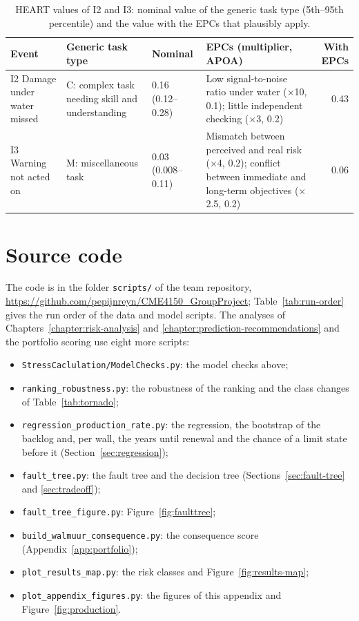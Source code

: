 \begin{table}[htbp]
\centering
\small
\caption{HEART values of I2 and I3: nominal value of the generic task type
(5th--95th percentile) and the value with the EPCs that plausibly apply.}
\label{tab:heart}
\begin{tabularx}{\textwidth}{@{}>{\raggedright\arraybackslash}p{2.4cm}
  >{\raggedright\arraybackslash}p{2.6cm} l >{\raggedright\arraybackslash}X r@{}}
\toprule
Event & Generic task type & Nominal & EPCs (multiplier, APOA) & With EPCs \\
\midrule
I2 Damage under water missed & C: complex task needing skill and understanding & 0.16 (0.12--0.28) & Low signal-to-noise ratio under water ($\times$10, 0.1); little independent checking ($\times$3, 0.2) & 0.43 \\
I3 Warning not acted on & M: miscellaneous task & 0.03 (0.008--0.11) & Mismatch between perceived and real risk ($\times$4, 0.2); conflict between immediate and long-term objectives ($\times$2.5, 0.2) & 0.06 \\
\bottomrule
\end{tabularx}
\end{table}

\clearpage
\section{Source code}
\label{app:pm-code}

The code is in the folder \texttt{scripts/} of the team repository,
\url{https://github.com/pepijnreyn/CME4150_GroupProject}; Table~\ref{tab:run-order} gives the run order of the data
and model scripts. The analyses of Chapters~\ref{chapter:risk-analysis} and
\ref{chapter:prediction-recommendations} and the portfolio scoring use eight
more scripts:
\begin{itemize}
  \item \texttt{StressCaclulation/ModelChecks.py}: the model checks above;
  \item \texttt{ranking\_robustness.py}: the robustness of the ranking and the
    class changes of Table~\ref{tab:tornado};
  \item \texttt{regression\_production\_rate.py}: the regression, the bootstrap
    of the backlog and, per wall, the years until renewal and the chance of a
    limit state before it (Section~\ref{sec:regression});
  \item \texttt{fault\_tree.py}: the fault tree and the decision tree
    (Sections~\ref{sec:fault-tree} and \ref{sec:tradeoff});
  \item \texttt{fault\_tree\_figure.py}: Figure~\ref{fig:faulttree};
  \item \texttt{build\_walmuur\_consequence.py}: the consequence score
    (Appendix~\ref{app:portfolio});
  \item \texttt{plot\_results\_map.py}: the risk classes and
    Figure~\ref{fig:results-map};
  \item \texttt{plot\_appendix\_figures.py}: the figures of this appendix and
    Figure~\ref{fig:production}.
\end{itemize}

